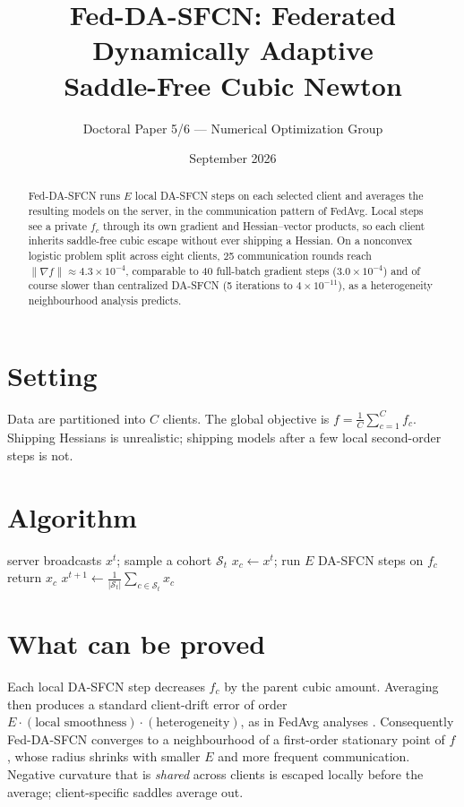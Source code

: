 \documentclass[11pt,a4paper]{article}
\title{\textbf{Fed-DA-SFCN: Federated Dynamically Adaptive\\
Saddle-Free Cubic Newton}}
\author{Doctoral Paper 5/6 --- Numerical Optimization Group}
\date{September 2026}
\begin{document}
\maketitle
\begin{abstract}
Fed-DA-SFCN runs $E$ local DA-SFCN steps on each selected client and
averages the resulting models on the server, in the communication pattern
of FedAvg. Local steps see a private $f_c$ through its own gradient and
Hessian--vector products, so each client inherits saddle-free cubic
escape without ever shipping a Hessian. On a nonconvex logistic problem
split across eight clients, 25 communication rounds reach
$\|\nabla f\|\approx 4.3\times 10^{-4}$, comparable to 40 full-batch
gradient steps ($3.0\times 10^{-4}$) and of course slower than
centralized DA-SFCN (5 iterations to $4\times 10^{-11}$), as a
heterogeneity neighbourhood analysis predicts.
\end{abstract}

\section{Setting}
Data are partitioned into $C$ clients. The global objective is
$f=\frac1C\sum_{c=1}^C f_c$. Shipping Hessians is unrealistic;
shipping models after a few local second-order steps is not.

\section{Algorithm}
\begin{algorithm}[h]
\caption{Fed-DA-SFCN}
\begin{algorithmic}[1]
  \State server broadcasts $x^t$; sample a cohort $\mathcal{S}_t$
        \State $x_c\gets x^t$; run $E$ DA-SFCN steps on $f_c$
        \State return $x_c$
  \EndFor
  \State $x^{t+1}\gets \frac1{|\mathcal{S}_t|}\sum_{c\in\mathcal{S}_t} x_c$
\EndFor
\end{algorithmic}
\end{algorithm}

\section{What can be proved}
Each local DA-SFCN step decreases $f_c$ by the parent cubic amount.
Averaging then produces a standard client-drift error of order
$E\cdot(\text{local smoothness})\cdot(\text{heterogeneity})$, as in
FedAvg analyses \cite{mcmahan2017,reddi2021}. Consequently Fed-DA-SFCN
converges to a neighbourhood of a first-order stationary point of $f$,
whose radius shrinks with smaller $E$ and more frequent communication.
Negative curvature that is \emph{shared} across clients is escaped
locally before the average; client-specific saddles average out.
\end{document}
